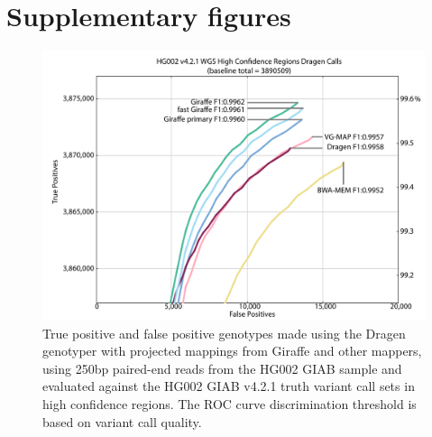 \documentclass[11pt]{ucscthesis}
\begin{document}
\section{Supplementary figures}

\begin{figure}[H]
    \centering
    \includegraphics[width=\linewidth]{HG002_v4.2.1_high_conf.35x_250bp.wgs.vcfevalroc.pdf}
    \caption[Genotyping evaluation for the Dragen genotyper with projected mappings from Giraffe and other mappers]{True positive and false positive genotypes made using the Dragen genotyper with projected mappings from Giraffe and other mappers, using 250bp paired-end reads from the HG002 GIAB sample and evaluated against the HG002 GIAB v4.2.1 truth variant call sets in high confidence regions. The ROC curve discrimination threshold is based on variant call quality.}
    \label{fig:250bp_genotyping}
\end{figure}
\end{document}
